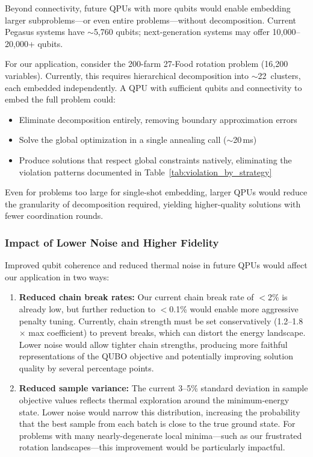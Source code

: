Beyond connectivity, future QPUs with more qubits would enable embedding larger subproblems---or even entire problems---without decomposition. Current Pegasus systems have $\sim$5,760 qubits; next-generation systems may offer 10,000--20,000+ qubits.

For our application, consider the 200-farm 27-Food rotation problem (16,200 variables). Currently, this requires hierarchical decomposition into $\sim$22~clusters, each embedded independently. A QPU with sufficient qubits and connectivity to embed the full problem could:
\begin{itemize}
    \item Eliminate decomposition entirely, removing boundary approximation errors
    \item Solve the global optimization in a single annealing call ($\sim$20\,ms)
    \item Produce solutions that respect global constraints natively, eliminating the violation patterns documented in Table~\ref{tab:violation_by_strategy}
\end{itemize}

Even for problems too large for single-shot embedding, larger QPUs would reduce the granularity of decomposition required, yielding higher-quality solutions with fewer coordination rounds.

\subsubsection{Impact of Lower Noise and Higher Fidelity}

Improved qubit coherence and reduced thermal noise in future QPUs would affect our application in two ways:

\begin{enumerate}
    \item \textbf{Reduced chain break rates:} Our current chain break rate of $<$2\% is already low, but further reduction to $<$0.1\% would enable more aggressive penalty tuning. Currently, chain strength must be set conservatively (1.2--1.8$\times$ max coefficient) to prevent breaks, which can distort the energy landscape. Lower noise would allow tighter chain strengths, producing more faithful representations of the QUBO objective and potentially improving solution quality by several percentage points.
    
    \item \textbf{Reduced sample variance:} The current 3--5\% standard deviation in sample objective values reflects thermal exploration around the minimum-energy state. Lower noise would narrow this distribution, increasing the probability that the best sample from each batch is close to the true ground state. For problems with many nearly-degenerate local minima---such as our frustrated rotation landscapes---this improvement would be particularly impactful.
\end{enumerate}

